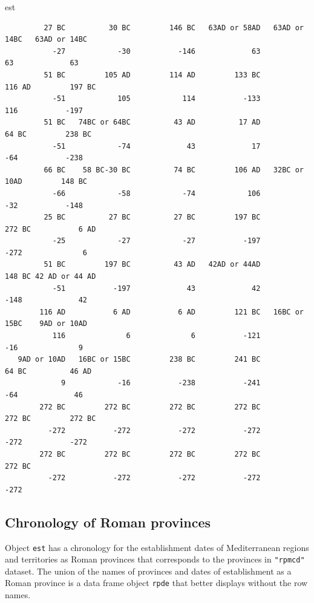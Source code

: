 \documentclass[a4paper,11pt]{memoir}
\newenvironment{Shaded}{\begin{snugshade}}{\end{snugshade}}
\newcommand{\NormalTok}[1]{#1}
\begin{document}
\begin{Shaded}
\begin{Highlighting}[]
\NormalTok{est}
\end{Highlighting}
\end{Shaded}

\begin{verbatim}
         27 BC          30 BC         146 BC   63AD or 58AD   63AD or 14BC   63AD or 14BC 
           -27            -30           -146             63             63             63 
         51 BC         105 AD         114 AD         133 BC         116 AD         197 BC 
           -51            105            114           -133            116           -197 
         51 BC   74BC or 64BC          43 AD          17 AD          64 BC         238 BC 
           -51            -74             43             17            -64           -238 
         66 BC    58 BC-30 BC          74 BC         106 AD   32BC or 10AD         148 BC 
           -66            -58            -74            106            -32           -148 
         25 BC          27 BC          27 BC         197 BC         272 BC           6 AD 
           -25            -27            -27           -197           -272              6 
         51 BC         197 BC          43 AD   42AD or 44AD         148 BC 42 AD or 44 AD 
           -51           -197             43             42           -148             42 
        116 AD           6 AD           6 AD         121 BC   16BC or 15BC    9AD or 10AD 
           116              6              6           -121            -16              9 
   9AD or 10AD   16BC or 15BC         238 BC         241 BC          64 BC          46 AD 
             9            -16           -238           -241            -64             46 
        272 BC         272 BC         272 BC         272 BC         272 BC         272 BC 
          -272           -272           -272           -272           -272           -272 
        272 BC         272 BC         272 BC         272 BC         272 BC 
          -272           -272           -272           -272           -272 
\end{verbatim}

\hypertarget{chronology-of-roman-provinces}{%
\subsection{Chronology of Roman
provinces}\label{chronology-of-roman-provinces}}

Object \texttt{est} has a chronology for the establishment dates of
Mediterranean regions and territories as Roman provinces that
corresponds to the provinces in \texttt{"rpmcd"} dataset. The union of
the names of provinces and dates of establishment as a Roman province is
a data frame object \texttt{rpde} that better displays without the row
names.
\end{document}
